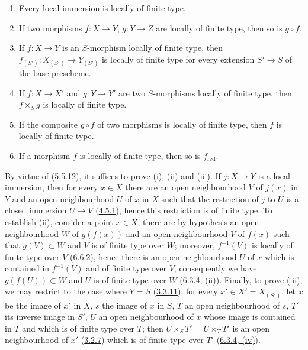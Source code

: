 \begin{proposition}[6.6.6]
\label{I.6.6.6}
\begin{enumerate}
  \item[\textup{(i)}] Every local immersion is locally of finite type.
  \item[\textup{(ii)}] If two morphisms $f:X\to Y$, $g:Y\to Z$ are locally of finite
    type, then so is $g\circ f$.
  \item[\textup{(iii)}] If $f:X\to Y$ is an $S$-morphism locally of finite type, then
    $f_{(S')}:X_{(S')}\to Y_{(S')}$ is locally of finite type for every
    extension $S'\to S$ of the base prescheme.
  \item[\textup{(iv)}] If $f:X\to X'$ and $g:Y\to Y'$ are two $S$-morphisms
    locally of finite type, then $f\times_S g$ is locally of finite type.
  \item[\textup{(v)}] If the composite $g\circ f$ of two morphisms is locally of
    finite type, then $f$ is locally of finite type.
  \item[\textup{(vi)}] If a morphism $f$ is locally of finite type, then so is
    $f_{\mathrm{red}}$.
\end{enumerate}
\end{proposition}

By virtue of (\hyperref[I.5.5.12]{5.5.12}), it suffices to prove (i), (ii)
and (iii). If $j:X\to Y$ is a local immersion, then for every $x\in X$ there
are an open neighbourhood $V$ of $j(x)$ in $Y$ and an open neighbourhood $U$ of
$x$ in $X$ such that the restriction of $j$ to $U$ is a closed immersion
$U\to V$ (\hyperref[I.4.5.1]{4.5.1}), hence this restriction is of finite
type. To establish (ii), consider a point $x\in X$; there are by hypothesis an
open neighbourhood $W$ of $g(f(x))$ and an open neighbourhood $V$ of $f(x)$
such that $g(V)\subset W$ and $V$ is of finite type over $W$; moreover,
$f^{-1}(V)$ is locally of finite type over $V$
(\hyperref[I.6.6.2]{6.6.2}), hence there is an open neighbourhood $U$ of
$x$ which
is contained in $f^{-1}(V)$ and of finite type over $V$; consequently we have
$g(f(U))\subset W$ and $U$ is of finite type over $W$
(\hyperref[I.6.3.4]{6.3.4, (ii)}). Finally, to prove (iii), we may
restrict to the case where $Y=S$ (\hyperref[I.3.3.11]{3.3.11}); for every
$x'\in X'=X_{(S')}$, let $x$ be the image of $x'$ in $X$, $s$ the image of $x$
in $S$, $T$ an open neighbourhood of $s$, $T'$ its inverse image in $S'$,
$U$ an open neighbourhood of $x$ whose image is contained in $T$ and which is
of finite type over $T$; then $U\times_S T'=U\times_T T'$ is an open
neighbourhood of $x'$ (\hyperref[I.3.2.7]{3.2.7}) which is of finite type
over $T'$ (\hyperref[I.6.3.4]{6.3.4, (iv)}).

